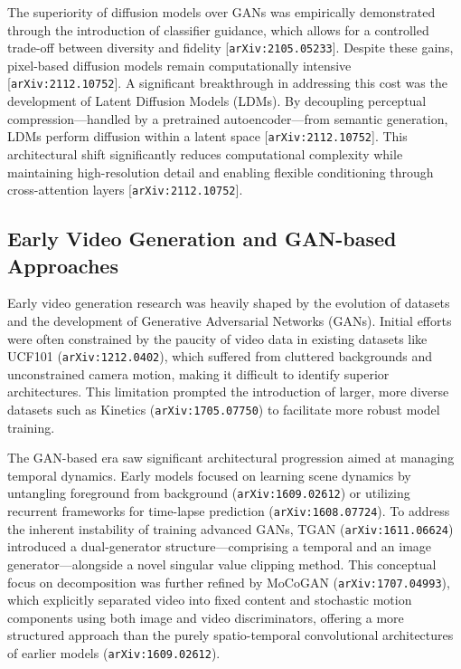 \documentclass[11pt]{article}
\begin{document}
The superiority of diffusion models over GANs was empirically demonstrated through the introduction of classifier guidance, which allows for a controlled trade-off between diversity and fidelity [\texttt{arXiv:2105.05233}]. Despite these gains, pixel-based diffusion models remain computationally intensive [\texttt{arXiv:2112.10752}]. A significant breakthrough in addressing this cost was the development of Latent Diffusion Models (LDMs). By decoupling perceptual compression—handled by a pretrained autoencoder—from semantic generation, LDMs perform diffusion within a latent space [\texttt{arXiv:2112.10752}]. This architectural shift significantly reduces computational complexity while maintaining high-resolution detail and enabling flexible conditioning through cross-attention layers [\texttt{arXiv:2112.10752}].

\subsection{Early Video Generation and GAN-based Approaches}

Early video generation research was heavily shaped by the evolution of datasets and the development of Generative Adversarial Networks (GANs). Initial efforts were often constrained by the paucity of video data in existing datasets like UCF101 (\texttt{arXiv:1212.0402}), which suffered from cluttered backgrounds and unconstrained camera motion, making it difficult to identify superior architectures. This limitation prompted the introduction of larger, more diverse datasets such as Kinetics (\texttt{arXiv:1705.07750}) to facilitate more robust model training.

The GAN-based era saw significant architectural progression aimed at managing temporal dynamics. Early models focused on learning scene dynamics by untangling foreground from background (\texttt{arXiv:1609.02612}) or utilizing recurrent frameworks for time-lapse prediction (\texttt{arXiv:1608.07724}). To address the inherent instability of training advanced GANs, TGAN (\texttt{arXiv:1611.06624}) introduced a dual-generator structure—comprising a temporal and an image generator—alongside a novel singular value clipping method. This conceptual focus on decomposition was further refined by MoCoGAN (\texttt{arXiv:1707.04993}), which explicitly separated video into fixed content and stochastic motion components using both image and video discriminators, offering a more structured approach than the purely spatio-temporal convolutional architectures of earlier models (\texttt{arXiv:1609.02612}).
\end{document}
